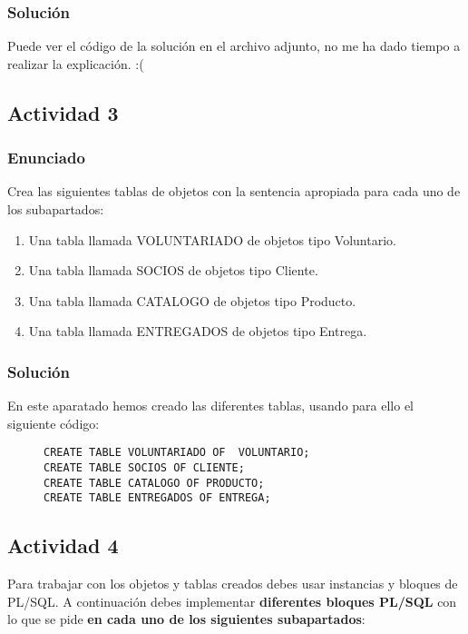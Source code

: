\subsubsection{Solución}
Puede ver el código de la solución en el archivo adjunto, no me ha dado tiempo a realizar la explicación. :(

\subsection{Actividad 3}

\subsubsection{Enunciado}
Crea las siguientes tablas de objetos con la sentencia apropiada para cada uno de los subapartados:

\begin{enumerate}[label=\alph*)]
    \item Una tabla llamada VOLUNTARIADO de objetos tipo Voluntario.
    \item Una tabla llamada SOCIOS de objetos tipo Cliente.
    \item Una tabla llamada CATALOGO de objetos tipo Producto.
    \item Una tabla llamada ENTREGADOS de objetos tipo Entrega.
\end{enumerate}

\subsubsection{Solución}
En este aparatado hemos creado las diferentes tablas, usando para ello el siguiente código:

\begin{figure}[H]
    \begin{tcolorbox}[sharp corners, colback=yellow!30, colframe=white!20]
        \tiny
        \begin{verbatim}
CREATE TABLE VOLUNTARIADO OF  VOLUNTARIO;
CREATE TABLE SOCIOS OF CLIENTE;
CREATE TABLE CATALOGO OF PRODUCTO;
CREATE TABLE ENTREGADOS OF ENTREGA;
        \end{verbatim}
    \end{tcolorbox}
\end{figure}

\subsection{Actividad 4}
Para trabajar con los objetos y tablas creados debes usar instancias y bloques de PL/SQL. A continuación debes implementar \textbf{diferentes bloques PL/SQL} con lo que se pide \textbf{en cada uno de los siguientes subapartados}:

